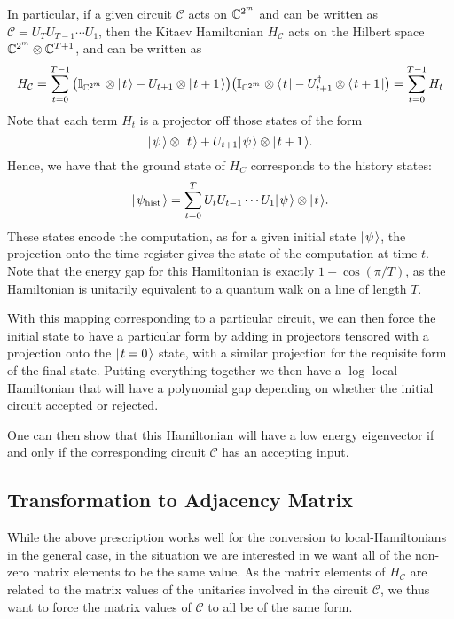 \documentclass[../thesis-main/thesis-main]{subfiles}
\begin{document}
In particular, if a given circuit $\mathcal{C}$ acts on $\mathbb{C}^{2^m}$ and can be written as $\mathcal{C} = U_{T}U_{T-1} \cdots U_1$, then the Kitaev Hamiltonian $H_\mathcal{C}$ acts on the Hilbert space $\mathbb{C}^{2^m}\otimes \mathbb{C}^{T+1}$, and can be written as
\begin{equation}
  H_\mathcal{C} = \sum_{t=0}^{T-1} \big(\mathbb{I}_{\mathbb{C}^{2^m}}\otimes |\mspace{2mu} t \mspace{2mu} \rangle - U_{t+1} \otimes |\mspace{2mu} t+1 \mspace{2mu} \rangle\big) \big(\mathbb{I}_{\mathbb{C}^{2^m}}\otimes \langle\mspace{2mu} t \mspace{2mu} | - U_{t+1}^\dag \otimes \langle\mspace{2mu} t+1 \mspace{2mu} |\big) = \sum_{t=0}^{T-1} H_t
\end{equation}
Note that each term $H_t$ is a projector off those states of the form
\begin{equation}
  |\mspace{2mu} \psi \mspace{2mu} \rangle \otimes |\mspace{2mu} t \mspace{2mu} \rangle + U_{t+1} |\mspace{2mu} \psi \mspace{2mu} \rangle \otimes |\mspace{2mu} t+1 \mspace{2mu} \rangle.
\end{equation}
Hence, we have that the ground state of $H_C$ corresponds to the history states:
\begin{equation}
  |\mspace{2mu} \psi_\text{hist} \mspace{2mu} \rangle = \sum_{t=0}^T U_t U_{t-1} \cdots U_1 |\mspace{2mu} \psi \mspace{2mu} \rangle \otimes |\mspace{2mu} t \mspace{2mu} \rangle.
\end{equation}
These states encode the computation, as for a given initial state $|\mspace{2mu} \psi \mspace{2mu} \rangle$, the projection onto the time register gives the state of the computation at time $t$.  Note that the energy gap for this Hamiltonian is exactly $1 - \cos(\pi/T)$, as the Hamiltonian is unitarily equivalent to a quantum walk on a line of length $T$.

With this mapping corresponding to a particular circuit, we can then force the initial state to have a particular form by adding in projectors tensored with a projection onto the $|\mspace{2mu} t=0 \mspace{2mu} \rangle$ state, with a similar projection for the requisite form of the final state.  Putting everything together we then have a $\log$-local Hamiltonian that will have a polynomial gap depending on whether the initial circuit accepted or rejected.

One can then show that this Hamiltonian will have a low energy eigenvector if and only if the corresponding circuit $\mathcal{C}$ has an accepting input.

\subsection{Transformation to Adjacency Matrix}

While the above prescription works well for the conversion to local-Hamiltonians in the general case, in the situation we are interested in we want all of the non-zero matrix elements to be the same value.  As the matrix elements of $H_\mathcal{C}$ are related to the matrix values of the unitaries involved in the circuit $\mathcal{C}$, we thus want to force the matrix values of $\mathcal{C}$ to all be of the same form.
\end{document}
